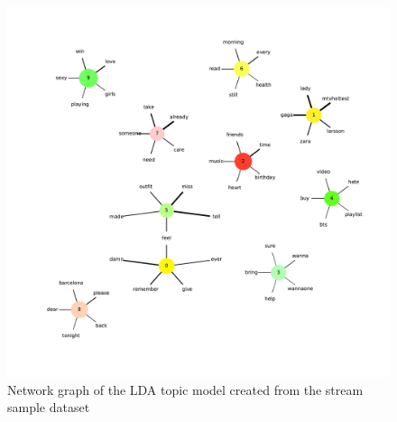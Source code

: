 \begin{figure}
    \centering
    \caption{Network graph of the LDA topic model created from the stream sample dataset}
    \label{fig:combined_network_graph}
    \includegraphics[width=\textwidth]{../figures/combined_network_graph.pdf}
\end{figure}

